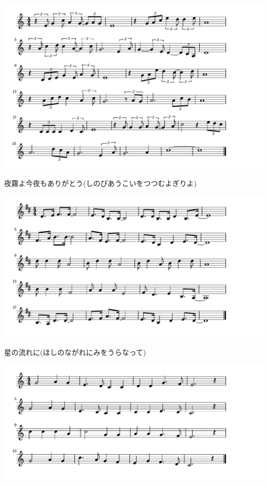 \documentclass[a4paper]{ltjsarticle}
\begin{document}
\includegraphics[clip]{yogiriyo_crop.pdf}

\vspace{-10mm} \hspace{10mm}
夜霧よ今夜もありがとう(しのびあうこいをつつむよぎりよ)


\includegraphics[clip]{hoshinonagareni_crop.pdf}

\vspace{-10mm} \hspace{10mm}
星の流れに(ほしのながれにみをうらなって)



\includegraphics[clip]{ichigatsuichijitsu_crop.pdf}
\end{document}
